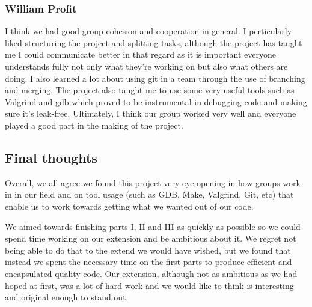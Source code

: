 \documentclass[11pt]{article}
\begin{document}
\subsubsection{William Profit}
I think we had good group cohesion and cooperation in general. I perticularly
liked structuring the project and splitting tasks, although the project has
taught me I could communicate better in that regard as it is important everyone
understands fully not only what they're working on but also what others are doing. I also
learned a lot about using git in a team through the use of branching and
merging. The project also taught me to use some very useful tools such as
Valgrind and gdb which proved to be instrumental in debugging code and making
sure it's leak-free. Ultimately, I think our group worked very well and everyone
played a good part in the making of the project.\\

\subsection{Final thoughts}
Overall, we all agree we found this project very eye-opening in how 
groups work in in our field and on tool usage (such as GDB, Make,
Valgrind, Git, etc) that enable us to work towards getting what we 
wanted out of our code.

We aimed towards finishing parts I, II and III as quickly as possible so we could spend time
working on our extension and be ambitious about it. We regret not being
able to do that to the extend we would have wished, but we found that 
instead we spent the necessary time on the first parts to produce 
efficient and encapsulated quality code. Our extension, although not
as ambitious as we had hoped at first, was a lot of hard work and we 
would like to think is interesting and original enough to stand out.\\
\end{document}
